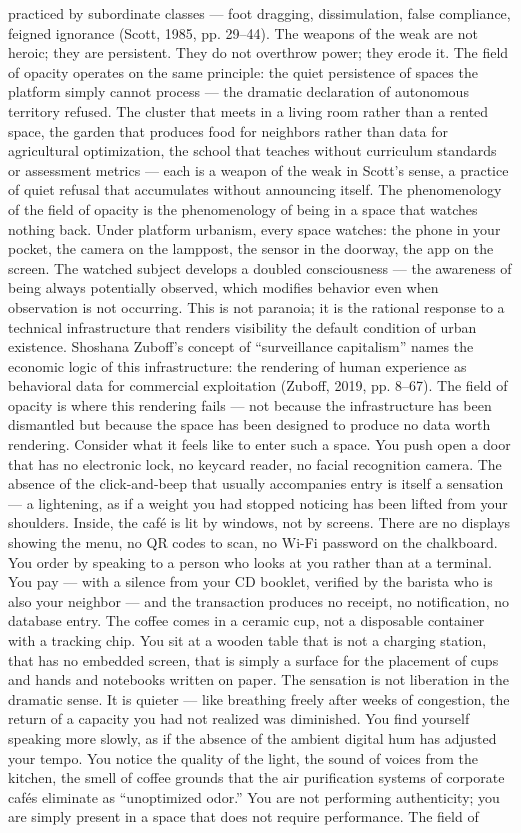 practiced by subordinate classes — foot dragging, dissimulation, false compliance, feigned ignorance (Scott, 1985, pp. 29–44). The weapons of the weak are not heroic; they are persistent. They do not overthrow power; they erode it. The field of opacity operates on the same principle: the quiet persistence of spaces the platform simply cannot process — the dramatic declaration of autonomous territory refused. The cluster that meets in a living room rather than a rented space, the garden that produces food for neighbors rather than data for agricultural optimization, the school that teaches without curriculum standards or assessment metrics — each is a weapon of the weak in Scott’s sense, a practice of quiet refusal that accumulates without announcing itself. The phenomenology of the field of opacity is the phenomenology of being in a space that watches nothing back. Under platform urbanism, every space watches: the phone in your pocket, the camera on the lamppost, the sensor in the doorway, the app on the screen. The watched subject develops a doubled consciousness — the awareness of being always potentially observed, which modifies behavior even when observation is not occurring. This is not paranoia; it is the rational response to a technical infrastructure that renders visibility the default condition of urban existence. Shoshana Zuboff’s concept of “surveillance capitalism” names the economic logic of this infrastructure: the rendering of human experience as behavioral data for commercial exploitation (Zuboff, 2019, pp. 8–67). The field of opacity is where this rendering fails — not because the infrastructure has been dismantled but because the space has been designed to produce no data worth rendering. Consider what it feels like to enter such a space. You push open a door that has no electronic lock, no keycard reader, no facial recognition camera. The absence of the click-and-beep that usually accompanies entry is itself a sensation — a lightening, as if a weight you had stopped noticing has been lifted from your shoulders. Inside, the café is lit by windows, not by screens. There are no displays showing the menu, no QR codes to scan, no Wi-Fi password on the chalkboard. You order by speaking to a person who looks at you rather than at a terminal. You pay — with a silence from your CD booklet, verified by the barista who is also your neighbor — and the transaction produces no receipt, no notification, no database entry. The coffee comes in a ceramic cup, not a disposable container with a tracking chip. You sit at a wooden table that is not a charging station, that has no embedded screen, that is simply a surface for the placement of cups and hands and notebooks written on paper. The sensation is not liberation in the dramatic sense. It is quieter — like breathing freely after weeks of congestion, the return of a capacity you had not realized was diminished. You find yourself speaking more slowly, as if the absence of the ambient digital hum has adjusted your tempo. You notice the quality of the light, the sound of voices from the kitchen, the smell of coffee grounds that the air purification systems of corporate cafés eliminate as “unoptimized odor.” You are not performing authenticity; you are simply present in a space that does not require performance. The field of 